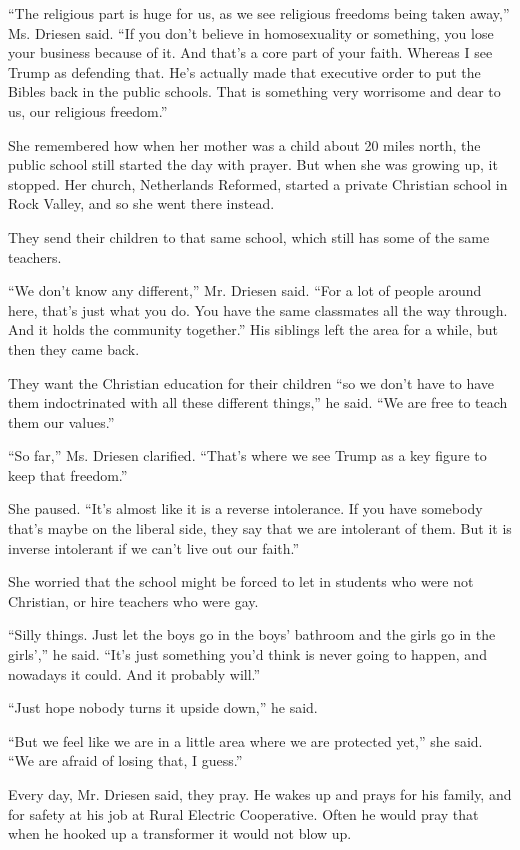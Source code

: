 ``The religious part is huge for us, as we see religious freedoms being
taken away,'' Ms. Driesen said. ``If you don't believe in homosexuality
or something, you lose your business because of it. And that's a core
part of your faith. Whereas I see Trump as defending that. He's actually
made that executive order to put the Bibles back in the public schools.
That is something very worrisome and dear to us, our religious
freedom.''

She remembered how when her mother was a child about 20 miles north, the
public school still started the day with prayer. But when she was
growing up, it stopped. Her church, Netherlands Reformed, started a
private Christian school in Rock Valley, and so she went there instead.

They send their children to that same school, which still has some of
the same teachers.

``We don't know any different,'' Mr. Driesen said. ``For a lot of people
around here, that's just what you do. You have the same classmates all
the way through. And it holds the community together.'' His siblings
left the area for a while, but then they came back.

They want the Christian education for their children ``so we don't have
to have them indoctrinated with all these different things,'' he said.
``We are free to teach them our values.''

``So far,'' Ms. Driesen clarified. ``That's where we see Trump as a key
figure to keep that freedom.''

She paused. ``It's almost like it is a reverse intolerance. If you have
somebody that's maybe on the liberal side, they say that we are
intolerant of them. But it is inverse intolerant if we can't live out
our faith.''

She worried that the school might be forced to let in students who were
not Christian, or hire teachers who were gay.

``Silly things. Just let the boys go in the boys' bathroom and the girls
go in the girls','' he said. ``It's just something you'd think is never
going to happen, and nowadays it could. And it probably will.''

``Just hope nobody turns it upside down,'' he said.

``But we feel like we are in a little area where we are protected yet,''
she said. ``We are afraid of losing that, I guess.''

Every day, Mr. Driesen said, they pray. He wakes up and prays for his
family, and for safety at his job at Rural Electric Cooperative. Often
he would pray that when he hooked up a transformer it would not blow up.

